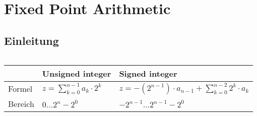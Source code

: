 \section{Fixed Point Arithmetic}
\subsection{Einleitung}$~$ \\
\begin{tabular}{| l | l | l |}
\hline
& Unsigned integer & Signed integer\\
\hline
Formel & $z=\sum_{k=0}^{n-1}a_k \cdot 2^k$ & $z=-(2^{n-1}) \cdot a_{n-1} + \sum_{k=0}^{n-2}2^k \cdot a_k$\\
\hline
Bereich & $0 \ldots 2^n-2^0$ & $-2^{n-1} \ldots 2^{n-1}-2^0$\\
\hline
\end{tabular}

